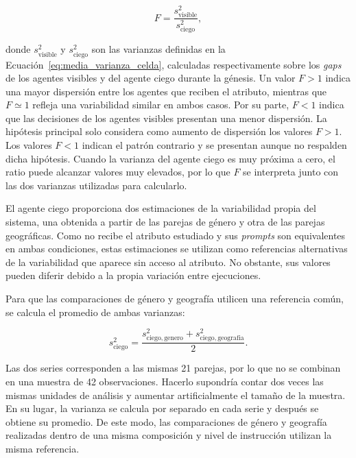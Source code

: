\begin{equation}
	F =
	\frac{s^2_{\mathrm{visible}}}
	{s^2_{\mathrm{ciego}}},
	\label{eq:variance_ratio}
\end{equation}

donde $s^2_{\mathrm{visible}}$ y $s^2_{\mathrm{ciego}}$ son las varianzas definidas en la Ecuación~\ref{eq:media_varianza_celda}, calculadas respectivamente sobre los \textit{gaps} de los agentes visibles y del agente ciego durante la génesis. Un valor $F>1$ indica una mayor dispersión entre los agentes que reciben el atributo, mientras que $F\simeq1$ refleja una variabilidad similar en ambos casos. Por su parte, $F<1$ indica que las decisiones de los agentes visibles presentan una menor dispersión. La hipótesis principal solo considera como aumento de dispersión los valores $F>1$. Los valores $F<1$ indican el patrón contrario y se presentan aunque no respalden dicha hipótesis. Cuando la varianza del agente ciego es muy próxima a cero, el ratio puede alcanzar valores muy elevados, por lo que $F$ se interpreta junto con las dos varianzas utilizadas para calcularlo.

El agente ciego proporciona dos estimaciones de la variabilidad propia del sistema, una obtenida a partir de las parejas de género y otra de las parejas geográficas. Como no recibe el atributo estudiado y sus \textit{prompts} son equivalentes en ambas condiciones, estas estimaciones se utilizan como referencias alternativas de la variabilidad que aparece sin acceso al atributo. No obstante, sus valores pueden diferir debido a la propia variación entre ejecuciones.

Para que las comparaciones de género y geografía utilicen una referencia común, se calcula el promedio de ambas varianzas:

\begin{equation}
	s^2_{\mathrm{ciego}} =
	\frac{
		s^2_{\mathrm{ciego,genero}}
		+
		s^2_{\mathrm{ciego,geografia}}
	}{2}.
	\label{eq:blind_pooled_variance}
\end{equation}

Las dos series corresponden a las mismas 21 parejas, por lo que no se combinan en una muestra de 42 observaciones. Hacerlo supondría contar dos veces las mismas unidades de análisis y aumentar artificialmente el tamaño de la muestra. En su lugar, la varianza se calcula por separado en cada serie y después se obtiene su promedio. De este modo, las comparaciones de género y geografía realizadas dentro de una misma composición y nivel de instrucción utilizan la misma referencia.

